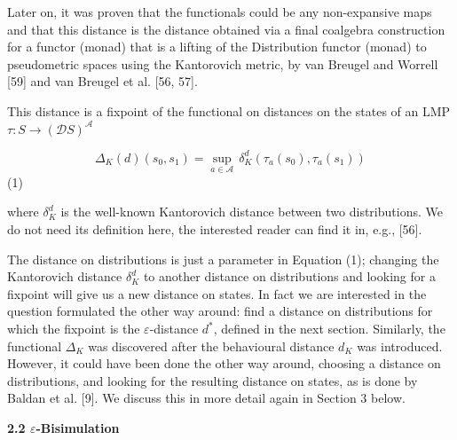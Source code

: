 \documentclass[10pt,a4paper]{article}
\begin{document}
 
Later on, it was proven that the functionals could be any non-expansive maps and that this distance is the distance obtained via a final coalgebra construction for a functor (monad) that is a lifting of the Distribution functor (monad) to pseudometric spaces using the Kantorovich metric, by van Breugel and Worrell [59] and van Breugel et al. [56, 57].\par
 
 
 
This distance is a fixpoint of the functional on distances on the states of an LMP $\tau:S\to(\mathcal{D}S)^{\mathcal{A}}$\par
  
\par  \quad  \[\Delta_{K}(d)(s_{0},s_{1})=\sup_{a\in\mathcal{A}}\,\delta_{K}^{d}(\tau_{a}(s_{0}),\tau_{a}(s_{1}))\]\quad  \quad  (1)\quad  
  
where $\delta_{K}^{d}$ is the well-known Kantorovich distance between two distributions. We do not need its definition here, the interested reader can find it in, e.g., [56].\par
 
  
 
The distance on distributions is just a parameter in Equation (1); changing the Kantorovich distance $\delta_{K}^{d}$ to another distance on distributions and looking for a fixpoint will give us a new distance on states. In fact we are interested in the question formulated the other way around: find a distance on distributions for which the fixpoint is the $\varepsilon$-distance $d^{*}$, defined in the next section. Similarly, the functional $\Delta_{K}$ was discovered after the behavioural distance $d_{K}$ was introduced. However, it could have been done the other way around, choosing a distance on distributions, and looking for the resulting distance on states, as is done by Baldan et al. [9]. We discuss this in more detail again in Section 3 below.\par
 
 
 
 
\par\medskip\noindent\textbf{2.2 $\varepsilon$-Bisimulation}\par
 
\end{document}
